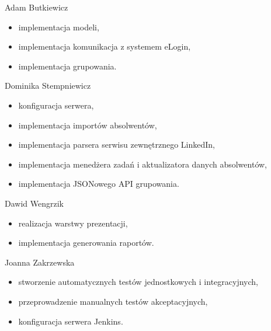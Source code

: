 \newpage
\begin{description}
\item Adam Butkiewicz

\begin{itemize}
\item implementacja modeli,
\item implementacja komunikacja z systemem eLogin,
\item implementacja grupowania.
\end{itemize}
\noindent

\item Dominika Stempniewicz

\begin{itemize}
\item konfiguracja serwera,
\item implementacja importów absolwentów,
\item implementacja parsera serwisu zewnętrznego LinkedIn,
\item implementacja menedżera zadań i aktualizatora danych absolwentów,
\item implementacja JSONowego API grupowania.
\end{itemize}
\noindent

\item Dawid Wengrzik

\begin{itemize}
\item realizacja warstwy prezentacji,
\item implementacja generowania raportów.
\end{itemize}
\noindent

\item Joanna Zakrzewska

\begin{itemize}
\item stworzenie automatycznych testów jednostkowych i integracyjnych,
\item przeprowadzenie manualnych testów akceptacyjnych,
\item konfiguracja serwera Jenkins.
\end{itemize}
\noindent

\end{description}
\noindent

